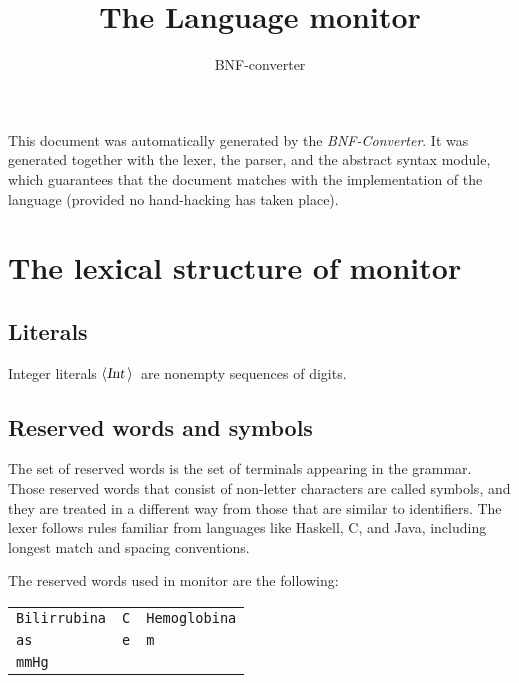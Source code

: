 \documentclass[a4paper,11pt]{article}
\author{BNF-converter}
\title{The Language monitor}
\begin{document}
\maketitle

\newcommand{\emptyP}{\mbox{$\epsilon$}}
\newcommand{\terminal}[1]{\mbox{{\texttt {#1}}}}
\newcommand{\nonterminal}[1]{\mbox{$\langle \mbox{{\sl #1 }} \! \rangle$}}
\newcommand{\arrow}{\mbox{::=}}
\newcommand{\delimit}{\mbox{$|$}}
\newcommand{\reserved}[1]{\mbox{{\texttt {#1}}}}
\newcommand{\literal}[1]{\mbox{{\texttt {#1}}}}
\newcommand{\symb}[1]{\mbox{{\texttt {#1}}}}

This document was automatically generated by the {\em BNF-Converter}. It was generated together with the lexer, the parser, and the abstract syntax module, which guarantees that the document matches with the implementation of the language (provided no hand-hacking has taken place).

\section*{The lexical structure of monitor}

\subsection*{Literals}
Integer literals \nonterminal{Int}\ are nonempty sequences of digits.




\subsection*{Reserved words and symbols}
The set of reserved words is the set of terminals appearing in the grammar. Those reserved words that consist of non-letter characters are called symbols, and they are treated in a different way from those that are similar to identifiers. The lexer follows rules familiar from languages like Haskell, C, and Java, including longest match and spacing conventions.

The reserved words used in monitor are the following: \\

\begin{tabular}{lll}
{\reserved{Bilirrubina}} &{\reserved{C}} &{\reserved{Hemoglobina}} \\
{\reserved{as}} &{\reserved{e}} &{\reserved{m}} \\
{\reserved{mmHg}} & & \\
\end{tabular}\\
\end{document}
